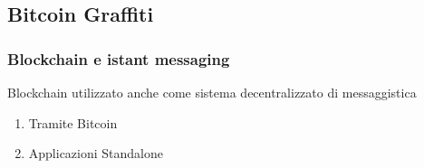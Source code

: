 \subsection{Bitcoin Graffiti}
\begin{frame}
 \frametitle{Blockchain e istant messaging}
 
 Blockchain utilizzato anche come sistema decentralizzato di messaggistica
 \begin{enumerate}
  \item<1-> Tramite Bitcoin
  \item<2-> Applicazioni Standalone
 \end{enumerate}

\end{frame}
